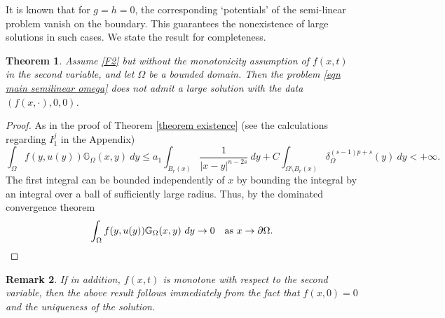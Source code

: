 \documentclass{amsart}
\newtheorem{theorem}{Theorem}[section]
\newtheorem{remark}[theorem]{Remark}
\newcommand{\gk}[1]{\mathbb{G}_{#1}}
\begin{document}
It is known that for $g=h=0$, the corresponding `potentials' of the semi-linear problem vanish on the boundary. This guarantees the nonexistence of large solutions in such cases.  We state the result for completeness.  
\begin{theorem}\label{thrm no large solution}
    Assume \ref{F2} but without the monotonicity assumption of $f(x,t)$ in the second variable, and let $\Omega$ be a bounded domain. Then the problem \eqref{eqn main semilinear omega} does not admit a large solution with the data $(f(x,\cdot),0,0)$.
\end{theorem}
\begin{proof}
   As in the proof of Theorem \ref{theorem existence} (see the calculations regarding $I_1^j$ in the Appendix)
   \begin{equation*}
       \int_{\Omega}f(y,u(y))\gk{\Omega}(x,y)\ dy\leq a_{1}\int_{B_{r}(x)}\frac{1}{|x-y|^{n-2s}}\ dy+C\int_{\Omega\setminus B_{r}(x)}\delta_{\Omega}^{(s-1)p+s}(y)\ dy<+\infty.
   \end{equation*}
  The first integral can be bounded independently of $x$ by bounding the integral by an integral over a ball of sufficiently large radius.  Thus, by the dominated convergence theorem 
   \begin{equation*}
       \int_{\Omega}f(y,u(y))\gk{\Omega}(x,y)\ dy\to 0 \quad\text{as }x\to \partial\Omega.\qedhere
   \end{equation*} 
\end{proof}
\begin{remark}
   If in addition, $f(x,t)$ is monotone with respect to the second variable, then the above result follows immediately from the fact that $f(x,0)=0$ and the uniqueness of the solution.
\end{remark}
\end{document}
